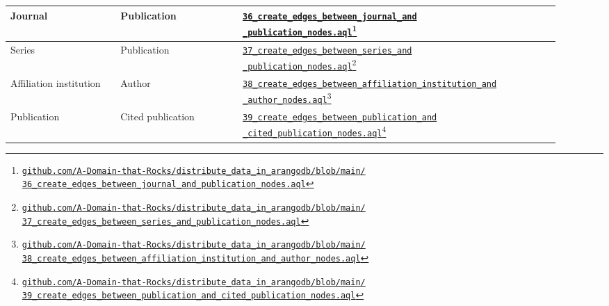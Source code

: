 \begin{center}
\begin{longtable}{p{0.18875\linewidth}p{0.20275\linewidth}p{0.52350\linewidth}}
		\hline
		Journal & Publication & \href{https://github.com/A-Domain-that-Rocks/distribute_data_in_arangodb/blob/main/36_create_edges_between_journal_and_publication_nodes.aql}{\texttt{36\_create\_edges\_between\_journal\_and\newline\_publication\_nodes.aql}}\footnote{\href{https://github.com/A-Domain-that-Rocks/distribute\_data\_in\_arangodb/blob/main/36\_create\_edges\_between\_journal\_and\_publication\_nodes.aql}{\texttt{github.com/A-Domain-that-Rocks/distribute\_data\_in\_arangodb/blob/main/\newline36\_create\_edges\_between\_journal\_and\_publication\_nodes.aql}}}\\
		\hline
		Series & Publication & \href{https://github.com/A-Domain-that-Rocks/distribute_data_in_arangodb/blob/main/37_create_edges_between_series_and_publication_nodes.aql}{\texttt{37\_create\_edges\_between\_series\_and\newline\_publication\_nodes.aql}}\footnote{\href{https://github.com/A-Domain-that-Rocks/distribute\_data\_in\_arangodb/blob/main/37\_create\_edges\_between\_series\_and\_publication\_nodes.aql}{\texttt{github.com/A-Domain-that-Rocks/distribute\_data\_in\_arangodb/blob/main/\newline37\_create\_edges\_between\_series\_and\_publication\_nodes.aql}}}\\
		\hline
		Affiliation institution & Author & \href{https://github.com/A-Domain-that-Rocks/distribute_data_in_arangodb/blob/main/38_create_edges_between_affiliation_institution_and_author_nodes.aql}{\texttt{38\_create\_edges\_between\_affiliation\_institution\_and\newline\_author\_nodes.aql}}\footnote{\href{https://github.com/A-Domain-that-Rocks/distribute\_data\_in\_arangodb/blob/main/38\_create\_edges\_between\_affiliation\_institution\_and\_author\_nodes.aql}{\texttt{github.com/A-Domain-that-Rocks/distribute\_data\_in\_arangodb/blob/main/\newline38\_create\_edges\_between\_affiliation\_institution\_and\_author\_nodes.aql}}}\\
		\hline
		Publication & Cited publication & \href{https://github.com/A-Domain-that-Rocks/distribute_data_in_arangodb/blob/main/39_create_edges_between_publication_and_cited_publication_nodes.aql}{\texttt{39\_create\_edges\_between\_publication\_and\newline\_cited\_publication\_nodes.aql}}\footnote{\href{https://github.com/A-Domain-that-Rocks/distribute\_data\_in\_arangodb/blob/main/39\_create\_edges\_between\_publication\_and\_cited\_publication\_nodes.aql}{\texttt{github.com/A-Domain-that-Rocks/distribute\_data\_in\_arangodb/blob/main/\newline39\_create\_edges\_between\_publication\_and\_cited\_publication\_nodes.aql}}}\\

\end{longtable}
\end{center}
